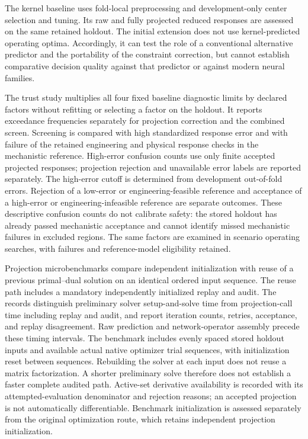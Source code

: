 \documentclass[a4paper,fleqn]{cas-sc}
\begin{document}
The kernel baseline uses fold-local preprocessing and development-only center selection and tuning. Its raw and fully projected reduced responses are assessed on the same retained holdout. The initial extension does not use kernel-predicted operating optima. Accordingly, it can test the role of a conventional alternative predictor and the portability of the constraint correction, but cannot establish comparative decision quality against that predictor or against modern neural families.

The trust study multiplies all four fixed baseline diagnostic limits by declared factors without refitting or selecting a factor on the holdout. It reports exceedance frequencies separately for projection correction and the combined screen. Screening is compared with high standardized response error and with failure of the retained engineering and physical response checks in the mechanistic reference. High-error confusion counts use only finite accepted projected responses; projection rejection and unavailable error labels are reported separately. The high-error cutoff is determined from development out-of-fold errors. Rejection of a low-error or engineering-feasible reference and acceptance of a high-error or engineering-infeasible reference are separate outcomes. These descriptive confusion counts do not calibrate safety: the stored holdout has already passed mechanistic acceptance and cannot identify missed mechanistic failures in excluded regions. The same factors are examined in scenario operating searches, with failures and reference-model eligibility retained.

Projection microbenchmarks compare independent initialization with reuse of a previous primal--dual solution on an identical ordered input sequence. The reuse path includes a mandatory independently initialized replay and audit. The records distinguish preliminary solver setup-and-solve time from projection-call time including replay and audit, and report iteration counts, retries, acceptance, and replay disagreement. Raw prediction and network-operator assembly precede these timing intervals. The benchmark includes evenly spaced stored holdout inputs and available actual native optimizer trial sequences, with initialization reset between sequences. Rebuilding the solver at each input does not reuse a matrix factorization. A shorter preliminary solve therefore does not establish a faster complete audited path. Active-set derivative availability is recorded with its attempted-evaluation denominator and rejection reasons; an accepted projection is not automatically differentiable. Benchmark initialization is assessed separately from the original optimization route, which retains independent projection initialization.
\end{document}
